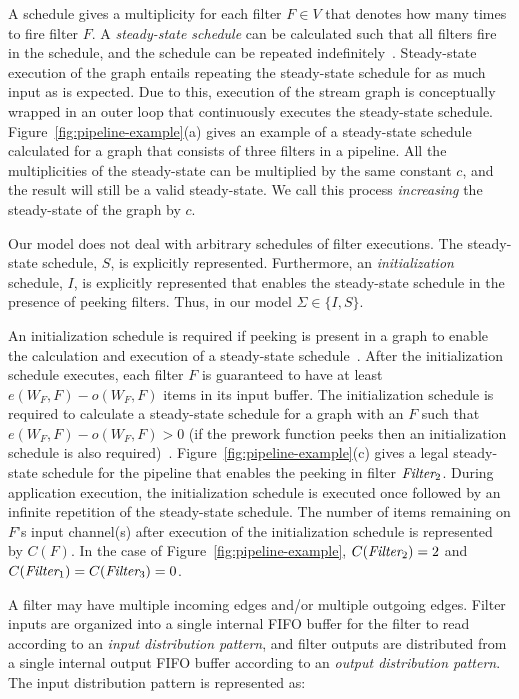A schedule gives a multiplicity for each filter $F \in V$ that denotes
how many times to fire filter $F$. A {\it steady-state schedule} can
be calculated such that all filters fire in the schedule, and the
schedule can be repeated indefinitely~\cite{lee87}.  Steady-state
execution of the graph entails repeating the steady-state schedule for
as much input as is expected.  Due to this, execution of the stream
graph is conceptually wrapped in an outer loop that continuously
executes the steady-state schedule.
Figure~\ref{fig:pipeline-example}(a) gives an example of a
steady-state schedule calculated for a graph that consists of three
filters in a pipeline.  All the multiplicities of the steady-state can
be multiplied by the same constant $c$, and the result will still be a
valid steady-state.  We call this process {\it increasing} the
steady-state of the graph by $c$.

Our model does not deal with arbitrary schedules of filter executions.
The steady-state schedule, $S$, is explicitly represented.
Furthermore, an {\it initialization} schedule, $I$, is explicitly
represented that enables the steady-state schedule in the presence of
peeking filters.  Thus, in our model $\Sigma \in \{I, S\}$. 

An initialization schedule is required if peeking is present in a
graph to enable the calculation and execution of a steady-state
schedule~\cite{karczma-thesis}.  After the initialization schedule
executes, each filter $F$ is guaranteed to have at least $e(W_F, F) -
o(W_F, F)$ items in its input buffer. The initialization schedule is
required to calculate a steady-state schedule for a graph with an $F$
such that $e(W_F, F) - o(W_F, F) > 0$ (if the prework function peeks
then an initialization schedule is also
required)~\cite{karczmarek-lctes03}.
Figure~\ref{fig:pipeline-example}(c) gives a legal steady-state
schedule for the pipeline that enables the peeking in filter
$\mbox{\it Filter}_2$.  During application execution, the initialization
schedule is executed once followed by an infinite repetition of the
steady-state schedule.   The number
of items remaining on $F$'s input channel(s) after execution of the
initialization schedule is represented by $C(F)$.  In the case of
Figure~\ref{fig:pipeline-example}, $C(\mbox{\it Filter}_2) = 2$ and
$C(\mbox{\it Filter}_1) = C(\mbox{\it Filter}_3) = 0$.

A filter may have multiple incoming edges and/or multiple outgoing
edges.  Filter inputs are organized into a single internal FIFO buffer for the
filter to read according to an {\it input distribution pattern}, and
filter outputs are distributed from a single internal output FIFO
buffer according to an {\it output distribution pattern}.   
The input distribution pattern is represented as:


